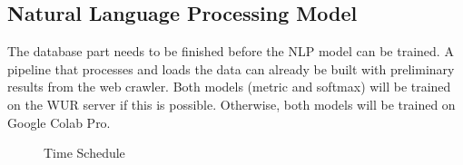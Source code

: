 \documentclass{article}
\begin{document}
\subsection{Natural Language Processing Model}
The database part needs to be finished before the NLP model can be trained.
A pipeline that processes and loads the data can already be built with preliminary results from the web crawler.
Both models (metric and softmax) will be trained on the WUR server if this is possible. 
Otherwise, both models will be trained on Google Colab Pro.


\begin{figure} [t]
    \centering
    \vspace{-2.5cm}
    \hspace{-1.3cm}
    \makebox[\textwidth][c]{}
    \caption{Time Schedule}
    \label{fig:time_schedule}
\end{figure}
\newpage
\printbibliography
\end{document}
